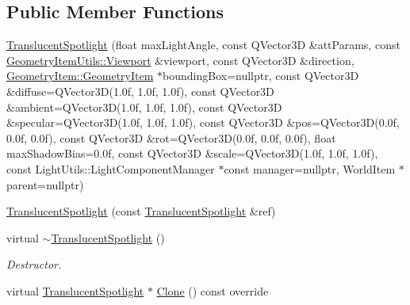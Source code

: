 \subsection*{Public Member Functions}
\begin{DoxyCompactItemize}
\item 
\mbox{\hyperlink{class_geometry_engine_1_1_geometry_world_item_1_1_geometry_light_1_1_translucent_spotlight_a76784772509475cca00793ea4b397035}{Translucent\+Spotlight}} (float max\+Light\+Angle, const Q\+Vector3D \&att\+Params, const \mbox{\hyperlink{class_geometry_engine_1_1_geometry_item_utils_1_1_viewport}{Geometry\+Item\+Utils\+::\+Viewport}} \&viewport, const Q\+Vector3D \&direction, \mbox{\hyperlink{class_geometry_engine_1_1_geometry_world_item_1_1_geometry_item_1_1_geometry_item}{Geometry\+Item\+::\+Geometry\+Item}} $\ast$bounding\+Box=nullptr, const Q\+Vector3D \&diffuse=Q\+Vector3D(1.\+0f, 1.\+0f, 1.\+0f), const Q\+Vector3\+D \&ambient=\+Q\+Vector3\+D(1.\+0f, 1.\+0f, 1.\+0f), const Q\+Vector3\+D \&specular=\+Q\+Vector3\+D(1.\+0f, 1.\+0f, 1.\+0f), const Q\+Vector3\+D \&pos=\+Q\+Vector3\+D(0.\+0f, 0.\+0f, 0.\+0f), const Q\+Vector3\+D \&rot=\+Q\+Vector3\+D(0.\+0f, 0.\+0f, 0.\+0f), float max\+Shadow\+Bias=0.\+0f, const Q\+Vector3\+D \&scale=\+Q\+Vector3\+D(1.\+0f, 1.\+0f, 1.\+0f), const Light\+Utils\+::\+Light\+Component\+Manager $\ast$const manager=nullptr, World\+Item $\ast$parent=nullptr)
\item 
\mbox{\hyperlink{class_geometry_engine_1_1_geometry_world_item_1_1_geometry_light_1_1_translucent_spotlight_a17ff276de5cc5558891f836bff4ab2a9}{Translucent\+Spotlight}} (const \mbox{\hyperlink{class_geometry_engine_1_1_geometry_world_item_1_1_geometry_light_1_1_translucent_spotlight}{Translucent\+Spotlight}} \&ref)
\item 
\mbox{\label{class_geometry_engine_1_1_geometry_world_item_1_1_geometry_light_1_1_translucent_spotlight_a93923ad675335b3e2a1114949e075603}} 
virtual \mbox{\hyperlink{class_geometry_engine_1_1_geometry_world_item_1_1_geometry_light_1_1_translucent_spotlight_a93923ad675335b3e2a1114949e075603}{$\sim$\+Translucent\+Spotlight}} ()
\begin{DoxyCompactList}\small\item\em Destructor. \end{DoxyCompactList}\item 
virtual \mbox{\hyperlink{class_geometry_engine_1_1_geometry_world_item_1_1_geometry_light_1_1_translucent_spotlight}{Translucent\+Spotlight}} $\ast$ \mbox{\hyperlink{class_geometry_engine_1_1_geometry_world_item_1_1_geometry_light_1_1_translucent_spotlight_a1d51bd602a6d25ba9189b2bb741bf4ef}{Clone}} () const override
\end{DoxyCompactItemize}
